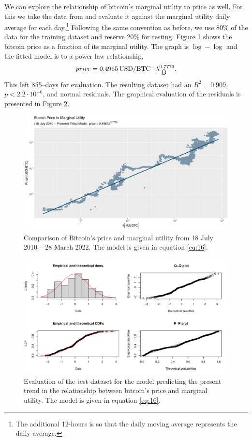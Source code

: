 \documentclass[runningheads]{llncs}
\def\bitcoin{
    \leavevmode
    \vtop{\offinterlineskip %
    \setbox0=\hbox{B}
    \setbox2=\hbox to\wd0{\hfil\hskip-.03em
    \vrule height .3ex width .15ex\hskip .08em
    \vrule height .3ex width .15ex\hfil}
    \vbox{\copy2\box0}\box2}
}
\begin{document}
We can explore the relationship of bitcoin's marginal utility to price as well.
For this we take the data from \cite{coin2022btcusd} and evaluate it against the marginal utility daily average for each day.\footnote{
    The additional 12-hours is so that the daily moving average represents the daily average.
}
Following the same convention as before, we use 80\% of the data for the training dataset and reserve 20\% for testing.
Figure \ref{fig:7} shows the bitcoin price as a function of its marginal utility.
The graph is $\log - \log$ and the fitted model is to a power law relationship,
\begin{equation}
    price = 0.4965 \, \mathrm{USD/BTC} \cdot \lambda_{\mbox{\bitcoin}}^{0.7779}.\label{eq:16}
\end{equation}
This left 855--days for evaluation.
The resulting dataset had an $R^2=0.909$, $p<2.2 \cdot 10^{-6}$, and normal residuals.
The graphical evaluation of the residuals is presented in Figure \ref{fig:8}.

\begin{figure}
    \includegraphics[width=\textwidth]{BTC Price and Marginal Utility.pdf}
    \caption{Comparison of Bitcoin's price and marginal utility from 18 July 2010 -- 28 March 2022.
        The model is given in equation \ref{eq:16}.} \label{fig:7}
\end{figure}
\begin{figure}
    \includegraphics[width=\textwidth]{BTC Price and Marginal Utility Fit Test.pdf}
    \caption{Evaluation of the test dataset for the model predicting the present trend in the relationship between bitcoin's price and marginal utility.
        The model is given in equation \ref{eq:16}.} \label{fig:8}
\end{figure}
\end{document}
